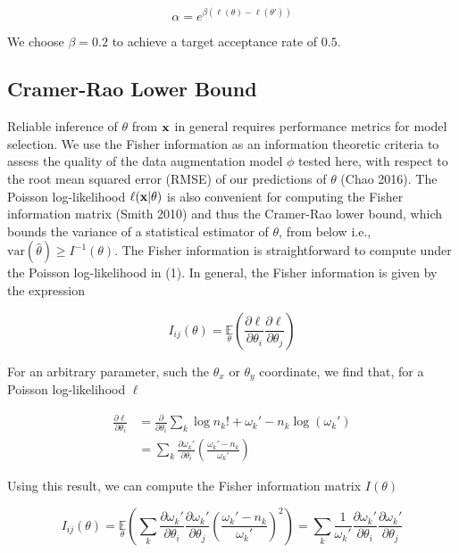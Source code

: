 \documentclass{article}
\begin{document}
\begin{equation*}
\alpha = e^{\beta(\ell(\theta)-\ell(\theta'))}
\end{equation*}

We choose $\beta=0.2$ to achieve a target acceptance rate of $0.5$.

\subsection{Cramer-Rao Lower Bound}

Reliable inference of $\theta$ from $\bold{x}$ in general requires performance metrics for model selection. We use the Fisher information as an information theoretic criteria to assess the quality of the data augmentation model $\phi$ tested here, with respect to the root mean squared error (RMSE) of our predictions of $\theta$ (Chao 2016). The Poisson log-likelihood $\ell(\bold{x}|\theta)$ is also convenient for computing the Fisher information matrix (Smith 2010) and thus the Cramer-Rao lower bound, which bounds the variance of a statistical estimator of $\theta$, from below i.e., $\mathrm{var}(\hat{\theta}) \geq I^{-1}(\theta)$. The Fisher information is straightforward to compute under the Poisson log-likelihood in (1). In general, the Fisher information is given by the expression

\begin{equation}
I_{ij}(\theta) = \underset{\theta}{\mathbb{E}}\left(\frac{\partial \ell}{\partial\theta_{i}}\frac{\partial\ell}{\partial\theta_{j}}\right) 
\end{equation}

For an arbitrary parameter, such the $\theta_{x}$ or $\theta_{y}$ coordinate, we find that, for a Poisson log-likelihood $\ell$

\begin{align*}
\frac{\partial \ell}{\partial \theta_{i}} &= \frac{\partial}{\partial \theta_{i}} \sum_{k}  \log n_{k}! + \omega_{k}' - n_{k}\log\left(\omega_{k}'\right)\\
&= \sum_{k} \frac{\partial \omega_{k}'}{\partial\theta_{i}} \left(\frac{\omega_{k}'-n_{k}}{\omega_{k}'}\right)
\end{align*}

Using this result, we can compute the Fisher information matrix $I(\theta)$

\begin{equation*}
I_{ij}(\theta) = \underset{\theta}{\mathbb{E}}\left(\sum_{k}\frac{\partial \omega_{k}'}{\partial\theta_{i}}\frac{\partial \omega_{k}'}{\partial\theta_{j}} \left(\frac{\omega_{k}'-n_{k}}{\omega_{k}'}\right)^{2}\right) = \sum_{k}\frac{1}{\omega_{k}'}\frac{\partial \omega_{k}'}{\partial\theta_{i}}\frac{\partial \omega_{k}'}{\partial\theta_{j}}
\end{equation*}
\end{document}

